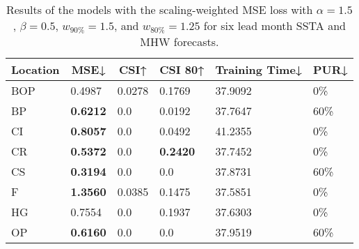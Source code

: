 \documentclass[11pt, a4paper]{article}
\begin{document}
\begin{table}[H]
\centering
\small
\caption{Results of the models with the scaling-weighted MSE loss with $\alpha=1.5$, $\beta=0.5$, $w_{90\%}=1.5$, and $w_{80\%}=1.25$ for six lead month SSTA and MHW forecasts.}
\begin{tabular}{llllll}
\multicolumn{1}{c}{\textbf{Location}} & \multicolumn{1}{c}{\textbf{MSE↓}} & \multicolumn{1}{c}{\textbf{CSI↑}} & \multicolumn{1}{c}{\textbf{CSI 80↑}} & \multicolumn{1}{c}{\textbf{Training Time↓}} & \multicolumn{1}{c}{\textbf{PUR↓}} \\ \hline
BOP                         & 0.4987                            & 0.0278                            & 0.1769                               & 37.9092                                     & 0\%                               \\
BP                        & \textbf{0.6212}                   & 0.0                               & 0.0192                               & 37.7647                                     & 60\%                              \\
CI                        & \textbf{0.8057}                   & 0.0                               & 0.0492                               & 41.2355                                     & 0\%                               \\
CR                           & \textbf{0.5372}                   & 0.0                               & \textbf{0.2420}                      & 37.7452                                     & 0\%                               \\
CS                           & \textbf{0.3194}                   & 0.0                               & 0.0                                  & 37.8731                                     & 60\%                              \\
F                             & \textbf{1.3560}                   & 0.0385                            & 0.1475                               & 37.5851                                     & 0\%                               \\
HG                          & 0.7554                            & 0.0                               & 0.1937                               & 37.6303                                     & 0\%                               \\
OP                       & \textbf{0.6160}                   & 0.0                               & 0.0                                  & 37.9519                                     & 60\%                              \\

\end{tabular}
\end{table}
\end{document}
